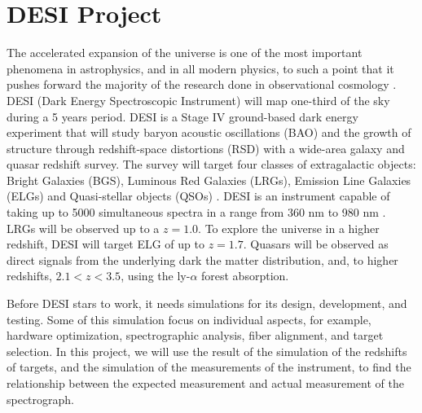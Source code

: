 \section{DESI Project}
The accelerated expansion of the universe is one of the most important phenomena in astrophysics, and in all modern physics, to such a point that it pushes forward the majority of the research done in observational cosmology \cite{Nord:2016plv}. DESI (Dark Energy Spectroscopic Instrument) will map one-third of the sky during a 5 years period\cite{Aghamousa:2016zmz}. DESI is a Stage IV ground-based dark energy experiment that will study baryon acoustic oscillations (BAO) and the growth of structure through redshift-space distortions (RSD) with a wide-area galaxy and quasar redshift survey. The survey will target four classes of extragalactic objects: Bright Galaxies (BGS), Luminous Red Galaxies (LRGs), Emission Line Galaxies (ELGs) and Quasi-stellar objects (QSOs) \cite{Aghamousa:2016zmz}. DESI is an instrument capable of taking up to 5000 simultaneous spectra in a range from 360 nm to 980 nm \cite{Aghamousa:2016sne}. 
LRGs will be observed up to a $z = 1.0$. To explore the universe in a higher redshift, DESI will target ELG of up to $z = 1.7$. Quasars will be observed as direct signals from the underlying dark the matter distribution, and, to higher redshifts, $2.1<z<3.5$, using the ly-$\alpha$ forest absorption. 

Before DESI stars to work, it needs simulations for its design, development, and testing. Some of this simulation focus on individual aspects, for example, hardware optimization, spectrographic analysis, fiber alignment, and target selection. In this project, we will use the result of the simulation of the redshifts of targets, and the simulation of the measurements of the instrument, to find the relationship between the expected measurement and actual measurement of the spectrograph.
